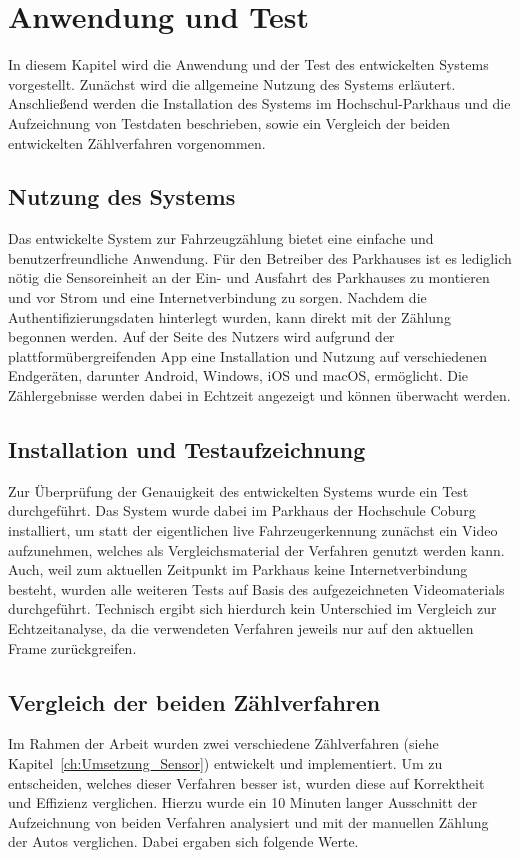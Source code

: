 \section{Anwendung und Test}\label{ch:Test}

In diesem Kapitel wird die Anwendung und der Test des entwickelten Systems vorgestellt.
Zunächst wird die allgemeine Nutzung des Systems erläutert.
Anschließend werden die Installation des Systems im Hochschul-Parkhaus und die Aufzeichnung von Testdaten beschrieben, sowie ein Vergleich der beiden entwickelten Zählverfahren vorgenommen.

\subsection{Nutzung des Systems}
Das entwickelte System zur Fahrzeugzählung bietet eine einfache und benutzerfreundliche Anwendung.
Für den Betreiber des Parkhauses ist es lediglich nötig die Sensoreinheit an der Ein- und Ausfahrt des Parkhauses zu montieren und vor Strom und eine Internetverbindung zu sorgen.
Nachdem die Authentifizierungsdaten hinterlegt wurden, kann direkt mit der Zählung begonnen werden.
Auf der Seite des Nutzers wird aufgrund der plattformübergreifenden App eine Installation und Nutzung auf verschiedenen Endgeräten, darunter Android, Windows, iOS und macOS, ermöglicht.
Die Zählergebnisse werden dabei in Echtzeit angezeigt und können überwacht werden.

\subsection{Installation und Testaufzeichnung}
Zur Überprüfung der Genauigkeit des entwickelten Systems wurde ein Test durchgeführt.
Das System wurde dabei im Parkhaus der Hochschule Coburg installiert, um statt der eigentlichen live Fahrzeugerkennung zunächst ein Video aufzunehmen, welches als Vergleichsmaterial der Verfahren genutzt werden kann.
Auch, weil zum aktuellen Zeitpunkt im Parkhaus keine Internetverbindung besteht, wurden alle weiteren Tests auf Basis des aufgezeichneten Videomaterials durchgeführt.
Technisch ergibt sich hierdurch kein Unterschied im Vergleich zur Echtzeitanalyse, da die verwendeten Verfahren jeweils nur auf den aktuellen Frame zurückgreifen.

\subsection{Vergleich der beiden Zählverfahren}
Im Rahmen der Arbeit wurden zwei verschiedene Zählverfahren (siehe Kapitel~\ref{ch:Umsetzung_Sensor}) entwickelt und implementiert.
Um zu entscheiden, welches dieser Verfahren besser ist, wurden diese auf Korrektheit und Effizienz verglichen.
Hierzu wurde ein 10 Minuten langer Ausschnitt der Aufzeichnung von beiden Verfahren analysiert und mit der manuellen Zählung der Autos verglichen.
Dabei ergaben sich folgende Werte.

